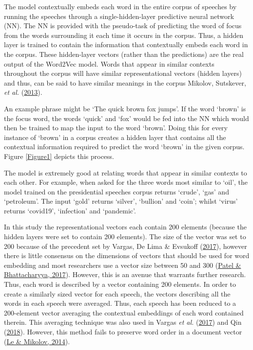 \documentclass[11pt,preprint, authoryear]{elsarticle}
\numberwithin{equation}{section}
\numberwithin{figure}{section}
\numberwithin{table}{section}
\begin{document}
The model contextually embeds each word in the entire corpus of speeches
by running the speeches through a single-hidden-layer predictive neural
network (NN). The NN is provided with the pseudo-task of predicting the
word of focus from the words surrounding it each time it occurs in the
corpus. Thus, a hidden layer is trained to contain the information that
contextually embeds each word in the corpus. These hidden-layer vectors
(rather than the predictions) are the real output of the Word2Vec model.
Words that appear in similar contexts throughout the corpus will have
similar representational vectors (hidden layers) and thus, can be said
to have similar meanings in the corpus Mikolov, Sutskever, \emph{et al.}
(\protect\hyperlink{ref-mikolov2013distributed}{2013}).

An example phrase might be `The quick brown fox jumps'. If the word
`brown' is the focus word, the words `quick' and `fox' would be fed into
the NN which would then be trained to map the input to the word `brown'.
Doing this for every instance of `brown' in a corpus creates a hidden
layer that contains all the contextual information required to predict
the word `brown' in the given corpus. Figure \ref{Figure1} depicts this
process.

The model is extremely good at relating words that appear in similar
contexts to each other. For example, when asked for the three words most
similar to `oil', the model trained on the presidential speeches corpus
returns `crude', `gas' and `petroleum'. The input `gold' returns
`silver', `bullion' and `coin'; whilst `virus' returns `covid19',
`infection' and `pandemic'.

In this study the representational vectors each contain 200 elements
(because the hidden layers were set to contain 200 elements). The size
of the vector was set to 200 because of the precedent set by Vargas, De
Lima \& Evsukoff (\protect\hyperlink{ref-vargas2017deep}{2017}), however
there is little consensus on the dimensions of vectors that should be
used for word embedding and most researchers use a vector size between
50 and 300
(\protect\hyperlink{ref-patel-bhattacharyya-2017-towards}{Patel \&
Bhattacharyya, 2017}). However, this is an avenue that warrants further
research. Thus, each word is described by a vector containing 200
elements. In order to create a similarly sized vector for each speech,
the vectors describing all the words in each speech were averaged. Thus,
each speech has been reduced to a 200-element vector averaging the
contextual embeddings of each word contained therein. This averaging
technique was also used in Vargas \emph{et al.}
(\protect\hyperlink{ref-vargas2017deep}{2017}) and Qin
(\protect\hyperlink{ref-qin230natural}{2018}). However, this method
fails to preserve word order in a document vector
(\protect\hyperlink{ref-le2014distributed}{Le \& Mikolov, 2014}).
\end{document}

